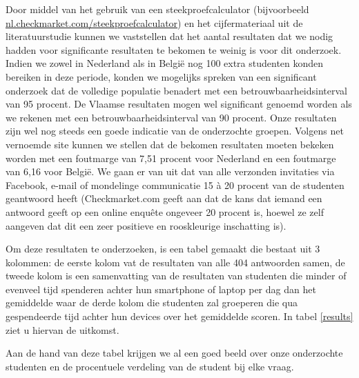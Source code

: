 Door middel van het gebruik van een steekproefcalculator (bijvoorbeeld \url{nl.checkmarket.com/steekproefcalculator}) en het cijfermateriaal uit de literatuurstudie kunnen we vaststellen dat het aantal resultaten dat we nodig hadden voor significante resultaten te bekomen te weinig is voor dit onderzoek. Indien we zowel in Nederland als in België nog 100 extra studenten konden bereiken in deze periode, konden we mogelijks spreken van een significant onderzoek dat de volledige populatie benadert met een betrouwbaarheidsinterval van 95 procent. De Vlaamse resultaten mogen wel significant genoemd worden als we rekenen met een betrouwbaarheidsinterval van 90 procent. Onze resultaten zijn wel nog steeds een goede indicatie van de onderzochte groepen. Volgens net vernoemde site kunnen we stellen dat de bekomen resultaten moeten bekeken worden met een foutmarge van 7,51 procent voor Nederland en een foutmarge van 6,16 voor België. We gaan er van uit dat van alle verzonden invitaties via Facebook, e-mail of mondelinge communicatie 15 à 20 procent van de studenten geantwoord heeft (Checkmarket.com geeft aan dat de kans dat iemand een antwoord geeft op een online enquête ongeveer 20 procent is, hoewel ze zelf aangeven dat dit een zeer positieve en rooskleurige inschatting is).

Om deze resultaten te onderzoeken, is een tabel gemaakt die bestaat uit 3 kolommen: de eerste kolom vat de resultaten van alle 404 antwoorden samen, de tweede kolom is een samenvatting van de resultaten van studenten die minder of evenveel tijd spenderen achter hun smartphone of laptop per dag dan het gemiddelde waar de derde kolom die studenten zal groeperen die qua gespendeerde tijd achter hun devices over het gemiddelde scoren. In tabel \ref{results} ziet u hiervan de uitkomst.

Aan de hand van deze tabel krijgen we al een goed beeld over onze onderzochte studenten en de procentuele verdeling van de student bij elke vraag.

